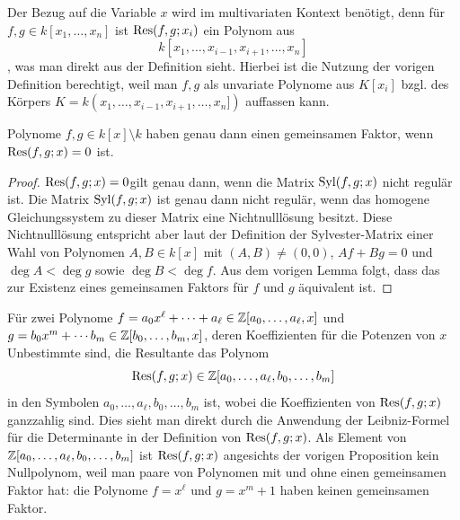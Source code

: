 \documentclass[11pt]{article}
\numberwithin{equation}{section}
\begin{document}
\begin{remark}
	Der Bezug auf die Variable $x$ wird im multivariaten Kontext benötigt, denn für $f,g \in k[x_1,\ldots,x_n]$ ist $\operatorname{Res}(f,g; x_i)$ ein Polynom aus \[
		k[x_1,\ldots,x_{i-1},x_{i+1},\ldots,x_n]
	\], was man direkt aus der Definition sieht. Hierbei ist die Nutzung der vorigen Definition berechtigt, weil man $f,g$ als unvariate Polynome aus $K[x_i]$ bzgl. des Körpers $K=k(x_1,\ldots,x_{i-1},x_{i+1},\ldots,x_n])$ auffassen kann. 
\end{remark} 

\begin{proposition} 
	Polynome $f,g \in k[x] \setminus k$ haben genau dann einen gemeinsamen Faktor, wenn $\operatorname{Res}(f,g;x) = 0$ ist. 
\end{proposition} 
\begin{proof} 
	$\operatorname{Res}(f,g;x)=0$gilt genau dann, wenn die Matrix $\operatorname{Syl}(f,g;x)$ nicht regulär ist. Die Matrix $\operatorname{Syl}(f,g;x)$ ist genau dann nicht regulär, wenn das homogene Gleichungssystem zu dieser Matrix eine Nichtnulllösung besitzt. Diese Nichtnulllösung entspricht aber laut der Definition der Sylvester-Matrix einer Wahl von Polynomen $A,B \in k[x]$ mit $(A,B) \ne (0,0)$, $A f + B g = 0$ und $\deg A < \deg g$ sowie $\deg B < \deg f$. Aus dem vorigen Lemma folgt, dass das zur Existenz eines gemeinsamen Faktors für $f$ und $g$ äquivalent ist. 
\end{proof} 

\begin{remark} 
		Für zwei Polynome $f = a_0 x^\ell + \cdots + a_\ell \in \mathbb{Z}[a_0,\ldots,a_\ell,x]$ und $g = b_0 x^m + \cdots b_m \in \mathbb{Z}[b_0,\ldots,b_m,x]$, deren Koeffizienten für die Potenzen von $x$ Unbestimmte sind, die Resultante das Polynom 
	\[
	\operatorname{Res}(f,g;x) \in \mathbb{Z}[a_0,\ldots,a_\ell,b_0,\ldots,b_m]
	\]
	in den Symbolen $a_0,\ldots,a_\ell,b_0,\ldots,b_m$ ist, wobei die Koeffizienten von $\operatorname{Res}(f,g;x)$ ganzzahlig sind. Dies sieht man direkt durch die Anwendung der Leibniz-Formel für die Determinante in der Definition von $\operatorname{Res}(f,g;x)$. Als Element von $\mathbb{Z}[a_0,\ldots,a_\ell,b_0,\ldots,b_m]$ ist $\operatorname{Res}(f,g;x)$ angesichts der vorigen Proposition kein Nullpolynom, weil man paare von Polynomen mit und ohne einen gemeinsamen Faktor hat: die Polynome $f= x^\ell$ und $g = x^m + 1$ haben keinen gemeinsamen Faktor. 
\end{remark} 
\end{document}
